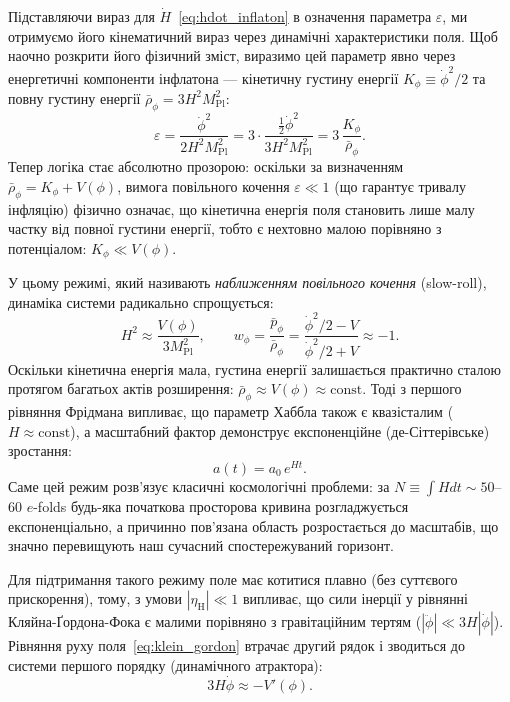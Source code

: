 Підставляючи вираз для $\dot{H}$~\eqref{eq:hdot_inflaton} в означення параметра $\varepsilon$, ми отримуємо його кінематичний вираз через динамічні характеристики поля. Щоб наочно розкрити його фізичний зміст, виразимо цей параметр явно через енергетичні компоненти інфлатона --- кінетичну густину енергії $K_\phi \equiv \dot{\phi}^2/2$ та повну густину енергії $\bar{\rho}_\phi = 3H^2 M_\mathrm{Pl}^2$:
\begin{equation}\label{eq:epsilon_energy_ratio}
  \varepsilon = \frac{\dot\phi^2}{2H^2 M_\mathrm{Pl}^2} = 3 \cdot \frac{\tfrac{1}{2}\dot{\phi}^2}{3H^2 M_\mathrm{Pl}^2} = 3 \, \frac{K_\phi}{\bar{\rho}_\phi}.
\end{equation}
Тепер логіка стає абсолютно прозорою: оскільки за визначенням $\bar{\rho}_\phi = K_\phi + V(\phi)$, вимога повільного кочення $\varepsilon \ll 1$ (що гарантує тривалу інфляцію) фізично означає, що кінетична енергія поля становить лише малу частку від повної густини енергії, тобто є нехтовно малою порівняно з потенціалом: $K_\phi \ll V(\phi)$.

У цьому режимі, який називають \emph{наближенням повільного кочення} (slow-roll), динаміка системи радикально спрощується:
\begin{equation}\label{eq:sr_approximations}
  H^2 \approx \frac{V(\phi)}{3M_\mathrm{Pl}^2}, \qquad
  w_\phi = \frac{\bar{p}_\phi}{\bar{\rho}_\phi} = \frac{\dot\phi^2/2 - V}{\dot\phi^2/2 + V} \approx -1.
\end{equation}
Оскільки кінетична енергія мала, густина енергії залишається практично сталою протягом багатьох актів розширення: $\bar{\rho}_\phi \approx V(\phi) \approx \mathrm{const}$. Тоді з першого рівняння Фрідмана випливає, що параметр Хаббла також є квазісталим ($H \approx \mathrm{const}$), а масштабний фактор демонструє експоненційне (де-Сіттерівське) зростання:
\begin{equation}\label{eq:a_exponential}
  a(t) = a_0\,e^{Ht}.
\end{equation}
Саме цей режим розв'язує класичні космологічні проблеми: за $N \equiv \int H dt \sim 50$--$60$ $e$-folds будь-яка початкова просторова кривина розгладжується експоненціально, а причинно пов'язана область розростається до масштабів, що значно перевищують наш сучасний спостережуваний горизонт.

Для підтримання такого режиму поле має котитися плавно (без суттєвого прискорення), тому, з умови $|\eta_\mathrm{H}| \ll 1$ випливає, що сили інерції у рівнянні Кляйна-Ґордона-Фока є малими порівняно з гравітаційним тертям ($|\ddot\phi| \ll 3H|\dot\phi|$). Рівняння руху поля~\eqref{eq:klein_gordon} втрачає другий рядок і зводиться до системи першого порядку (динамічного атрактора):
\begin{equation}\label{eq:sr_attractor}
  3H\dot{\phi} \approx -V'(\phi).
\end{equation}


